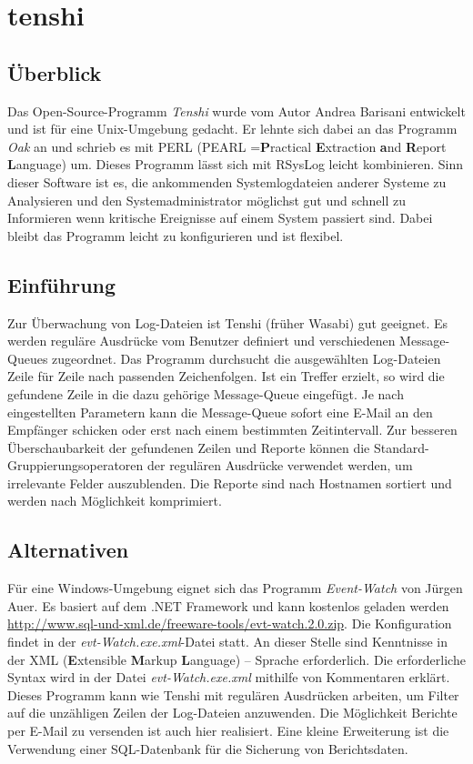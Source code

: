\section{tenshi}
\subsection{Überblick}
Das Open-Source-Programm \textit{Tenshi} wurde vom Autor Andrea Barisani entwickelt und ist für eine Unix-Umgebung gedacht. Er lehnte sich dabei an das Programm \textit{Oak} an und schrieb es mit PERL (PEARL =\textbf{P}ractical \textbf{E}xtraction \textbf{a}nd \textbf{R}eport \textbf{L}anguage) um. Dieses Programm lässt sich mit RSysLog leicht kombinieren. Sinn dieser Software ist es, die ankommenden Systemlogdateien anderer Systeme zu Analysieren und den Systemadministrator möglichst gut und schnell zu Informieren wenn kritische Ereignisse auf einem System passiert sind. Dabei bleibt das Programm leicht zu konfigurieren und ist flexibel.

\subsection{Einführung}
Zur Überwachung von Log-Dateien ist Tenshi (früher Wasabi) gut geeignet. Es werden reguläre Ausdrücke vom Benutzer definiert und verschiedenen Message-Queues zugeordnet. Das Programm durchsucht die ausgewählten Log-Dateien Zeile für Zeile nach passenden Zeichenfolgen. Ist ein Treffer erzielt, so wird die gefundene Zeile in die dazu gehörige Message-Queue eingefügt. Je nach eingestellten Parametern kann die Message-Queue sofort eine E-Mail an den Empfänger schicken oder erst nach einem bestimmten Zeitintervall. 
Zur besseren Überschaubarkeit der gefundenen Zeilen und Reporte können die Standard-Gruppierungsoperatoren der regulären Ausdrücke verwendet werden, um irrelevante Felder auszublenden. 
Die Reporte sind nach Hostnamen sortiert und werden nach Möglichkeit komprimiert. \cite{TenshiDescription}

\subsection{Alternativen}
Für eine Windows-Umgebung  eignet sich das Programm \textit{Event-Watch} von Jürgen Auer. Es basiert auf dem .NET Framework und kann kostenlos geladen werden \url{http://www.sql-und-xml.de/freeware-tools/evt-watch.2.0.zip}. Die Konfiguration findet  in der \textit{evt-Watch.exe.xml}-Datei statt. An dieser Stelle sind Kenntnisse in der XML (\textbf{E}xtensible \textbf{M}arkup \textbf{L}anguage) – Sprache erforderlich. Die erforderliche Syntax wird in der Datei \textit{evt-Watch.exe.xml } mithilfe von Kommentaren erklärt. Dieses Programm kann wie Tenshi mit regulären Ausdrücken arbeiten, um Filter auf die unzähligen Zeilen der Log-Dateien anzuwenden. Die Möglichkeit Berichte per E-Mail zu versenden ist auch hier realisiert. Eine kleine Erweiterung ist die Verwendung einer SQL-Datenbank für die Sicherung von Berichtsdaten.


